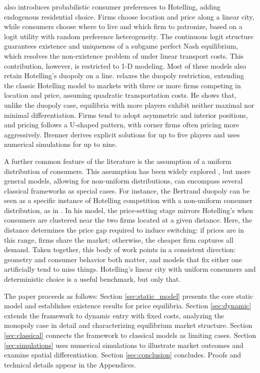 \documentclass{article}
\begin{document}
\cite{wrede2015continuous} also introduces probabilistic consumer preferences to Hotelling, adding endogenous residential choice. Firms choose location and price along a linear city, while consumers choose where to live and which firm to patronize, based on a logit utility with random preference heterogeneity. The continuous logit structure guarantees existence and uniqueness of a subgame perfect Nash equilibrium, which resolves the non-existence problem of \cite{daspremont1979hotelling} under linear transport costs. This contribution, however, is restricted to 1-D modeling. Most of these models also retain Hotelling's duopoly on a line. \cite{Brenner2005} relaxes the duopoly restriction, extending the classic Hotelling model to markets with three or more firms competing in location and price, assuming quadratic transportation costs. He shows that, unlike the duopoly case, equilibria with more players exhibit neither maximal nor minimal differentiation. Firms tend to adopt asymmetric and interior positions, and pricing follows a U-shaped pattern, with corner firms often pricing more aggressively. Brenner derives explicit solutions for up to five players and uses numerical simulations for up to nine.

A further common feature of the literature is the assumption of a uniform distribution of consumers. This assumption has been widely explored \citep{Neven1986}, but more general models, allowing for non-uniform distributions, can encompass several classical frameworks as special cases. For instance, the Bertrand duopoly can be seen as a specific instance of Hotelling competition with a non-uniform consumer distribution, as in \citet{Rashid2016}. In his model, the price-setting stage mirrors Hotelling's when consumers are clustered near the two firms located at a given distance. Here, the distance determines the price gap required to induce switching: if prices are in this range, firms share the market; otherwise, the cheaper firm captures all demand. Taken together, this body of work points in a consistent direction: geometry and consumer behavior both matter, and models that fix either one artificially tend to miss things. Hotelling's linear city with uniform consumers and deterministic choice is a useful benchmark, but only that.


The paper proceeds as follows: Section \ref{sec:static_model} presents the core static model and establishes existence results for price equilibria. Section \ref{sec:dynamic} extends the framework to dynamic entry with fixed costs, analyzing the monopoly case in detail and characterizing equilibrium market structure. Section \ref{sec:classical} connects the framework to classical models as limiting cases. Section \ref{sec:simulations} uses numerical simulations to illustrate market outcomes and examine spatial differentiation. Section \ref{sec:conclusion} concludes. Proofs and technical details appear in the Appendices.
\end{document}
